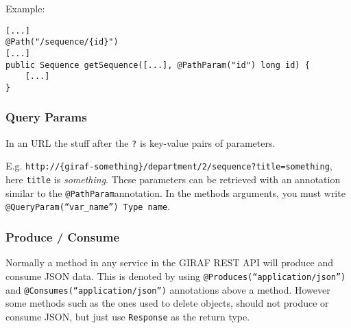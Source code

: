 \newpage
\noindent
Example:
\begin{lstlisting}
[...]
@Path("/sequence/{id}")
[...]
public Sequence getSequence([...], @PathParam("id") long id) {
    [...]
}
\end{lstlisting}

\subsubsection{Query Params}
In an URL the stuff after the \texttt{?} is key-value pairs of parameters.

E.g. \texttt{http://\{giraf-something\}/department/2/sequence?title=something}, here \texttt{title} is \textit{something}.
These parameters can be retrieved with an annotation similar to the \texttt{@PathParam}annotation.
In the methods arguments, you must write \texttt{@QueryParam(``var\_name'') Type name}.


\subsubsection{Produce / Consume}
Normally a method in any service in the GIRAF REST API will produce and consume JSON data. This is denoted by using \texttt{@Produces(``application/json'')} and \texttt{@Consumes(``application/json'')} annotations above a method.
However some methods such as the ones used to delete objects, should not produce or consume JSON, but just use \texttt{Response} as the return type.
